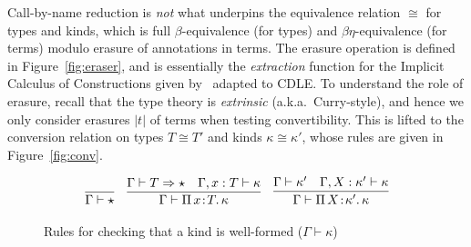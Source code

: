 \documentclass{article}
\newcommand{\abs}[4]{{#1}\, #2\! : \! #3.\, #4}
\newcommand{\tpsynth}[0]{\Rightarrow}
\begin{document}
Call-by-name reduction is \emph{not} what underpins the
equivalence relation \(\cong\) for types and kinds, which is full
\(\beta\)-equivalence (for types) and \(\beta\eta\)-equivalence (for terms)
modulo erasure of annotations in terms.
The erasure operation is defined in Figure~\ref{fig:eraser}, and is essentially
the \emph{extraction} function for the Implicit Calculus of Constructions given
by~\cite{BB08_ICC-as-a-Programming-Language} adapted to CDLE.
To understand the role of erasure, recall that the type theory is \emph{extrinsic} (a.k.a.\
Curry-style), and hence we only consider erasures \(|t|\) of terms when testing
convertibility.
This is lifted to the conversion relation on types \(T \cong T'\) and kinds
\(\kappa \cong \kappa'\), whose rules are given in
Figure~\ref{fig:conv}.

\begin{figure}
  \[
  \begin{array}{ccc}
    \infer{\Gamma \vdash \star}{\ } &
    \infer{\Gamma\vdash\abs{\Pi}{x}{T}{\kappa}}{\Gamma \vdash T \tpsynth \star & \Gamma,x:T\vdash\kappa} &
    \infer{\Gamma\vdash\abs{\Pi}{X}{\kappa'}{\kappa}}{\Gamma \vdash \kappa' & \Gamma,X:\kappa'\vdash\kappa}
  \end{array}
  \]
  \caption{Rules for checking that a kind is well-formed ($\Gamma \vdash \kappa$)}
  \label{fig:superknd}
\end{figure}
\end{document}
